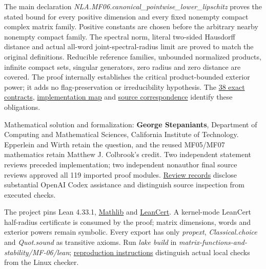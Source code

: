 \documentclass[11pt,a4paper]{article}
\begin{document}
The main declaration
\textit{NLA.MF06.canonical\_pointwise\_lower\_lipschitz} proves the
stated bound for every positive dimension and every fixed nonempty
compact complex matrix family. Positive constants are chosen before the
arbitrary nearby nonempty compact family. The spectral norm, literal
two-sided Hausdorff distance and actual all-word joint-spectral-radius
limit are proved to match the original definitions. Reducible reference
families, unbounded normalized products, infinite compact sets, singular
generators, zero radius and zero distance are covered. The proof
internally establishes the critical product-bounded exterior power; it
adds no flag-preservation or irreducibility hypothesis. The
\href{https://github.com/ajt60gaibb/OpenProblemsInNLA/blob/main/matrix-functions-and-stability/MF-06/lean/Challenge.lean}{38
exact contracts},
\href{https://github.com/ajt60gaibb/OpenProblemsInNLA/blob/main/matrix-functions-and-stability/MF-06/lean/IMPLEMENTATION-MAP.json}{implementation
map} and
\href{https://github.com/ajt60gaibb/OpenProblemsInNLA/blob/main/matrix-functions-and-stability/MF-06/lean/SourceCorrespondence.md}{source
correspondence} identify these obligations.

Mathematical solution and formalization: \textbf{George Stepaniants},
Department of Computing and Mathematical Sciences, California Institute
of Technology. Epperlein and Wirth retain the question, and the reused
MF05/MF07 mathematics retain Matthew J. Colbrook's credit. Two
independent statement reviews preceded implementation; two independent
nonauthor final source reviews approved all 119 imported proof modules.
\href{https://github.com/ajt60gaibb/OpenProblemsInNLA/blob/main/matrix-functions-and-stability/MF-06/lean/reviews/README.md}{Review
records} disclose substantial OpenAI Codex assistance and distinguish
source inspection from executed checks.

The project pins Lean 4.33.1,
\href{https://github.com/leanprover-community/mathlib4/tree/0df444a360eaa60ab8c11dca51a86af692955474}{Mathlib}
and
\href{https://github.com/alerad/leancert/tree/621a43d7cf21f87872392a01e874f2f1dbddc926}{LeanCert}.
A kernel-mode LeanCert half-radius certificate is consumed by the proof;
matrix dimensions, words and exterior powers remain symbolic. Every
export has only \textit{propext}, \textit{Classical.choice} and
\textit{Quot.sound} as transitive axioms. Run \textit{lake build} in
\textit{matrix-functions-and-stability/MF-06/lean};
\href{https://github.com/ajt60gaibb/OpenProblemsInNLA/blob/main/matrix-functions-and-stability/MF-06/lean/README.md}{reproduction
instructions} distinguish actual local checks from the Linux checker.
\end{document}
